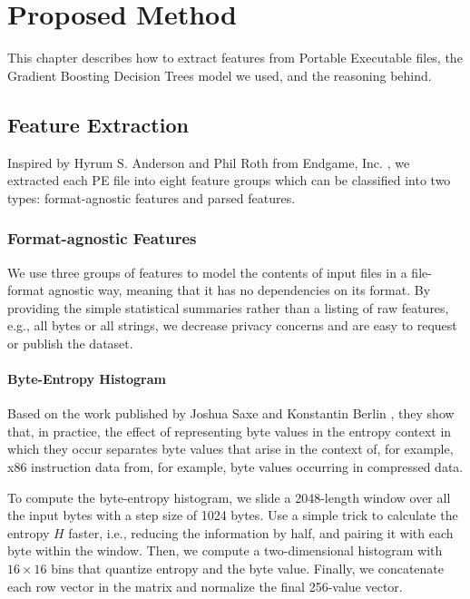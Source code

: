 \chapter{Proposed Method}
\graphicspath{{Chapter4/Figs/}}

\begin{chapabstract}
This chapter describes how to extract features from Portable Executable files, the Gradient Boosting Decision Trees model we used, and the reasoning behind.
\end{chapabstract}

\section{Feature Extraction}
\label{sec:feature-extraction}

Inspired by Hyrum S. Anderson and Phil Roth from Endgame, Inc. \cite{anderson2018ember}, we extracted each PE file into eight feature groups which can be classified into two types: format-agnostic features and parsed features.

\subsection{Format-agnostic Features}

We use three groups of features to model the contents of input files in a file-format agnostic way, meaning that it has no dependencies on its format. By providing the simple statistical summaries rather than a listing of raw features, e.g., all bytes or all strings, we decrease privacy concerns and are easy to request or publish the dataset.

\subsubsection{Byte-Entropy Histogram}

Based on the work published by Joshua Saxe and Konstantin Berlin \cite{saxe2015deep}, they show that, in practice, the effect of representing byte values in the entropy context in which they occur separates byte values that arise in the context of, for example, x86 instruction data from, for example, byte values occurring in compressed data.

To compute the byte-entropy histogram, we slide a 2048-length window over all the input bytes with a step size of 1024 bytes. Use a simple trick to calculate the entropy $H$ faster, i.e., reducing the information by half, and pairing it with each byte within the window. Then, we compute a two-dimensional histogram with $16 \times 16$ bins that quantize entropy and the byte value. Finally, we concatenate each row vector in the matrix and normalize the final 256-value vector.

